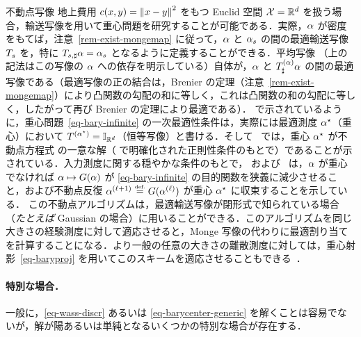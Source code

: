 \begin{rem2}{不動点写像}
地上費用 $c(x,y)=\left\| x-y \right\|^2$ をもつ Euclid 空間 $\mathcal{X}=\mathbb{R}^d$ を扱う場合，輸送写像を用いて重心問題を研究することが可能である．実際，$\alpha$ が密度をもてば，注意~\ref{rem-exist-mongemap} に従って，$\alpha$ と $\alpha_s$ の間の最適輸送写像 $T_s$ を，特に $T_{s,\sharp}\alpha = \alpha_s$ となるように定義することができる．平均写像
（上の記法はこの写像の $\alpha$ への依存を明示している）自体が，$\alpha$ と $T^{(\alpha)}_\sharp \alpha$ の間の最適写像である（最適写像の正の結合は，Brenier の定理（注意~\ref{rem-exist-mongemap}）により凸関数の勾配の和に等しく，これは凸関数の和の勾配に等しく，したがって再び Brenier の定理により最適である）．
\citep{Carlier_wasserstein_barycenter} で示されているように，重心問題~\eqref{eq-bary-infinite} の一次最適性条件は，実際には最適測度 $\alpha^\star$（重心）において $T^{(\alpha^\star)}=\mathbb{I}_{\mathbb{R}^d}$（恒等写像）と書ける．そして~\citep{alvarez2016fixed} では，重心 $\alpha^\star$ が不動点方程式
の一意な解（\citep[Theo. 2]{zemel2017fr} で明確化された正則性条件のもとで）であることが示されている．入力測度に関する穏やかな条件のもとで，\citet{alvarez2016fixed} および~\citet{zemel2017fr} は，$\alpha$ が重心でなければ $\alpha \mapsto G(\alpha)$ が \eqref{eq-bary-infinite} の目的関数を狭義に減少させること，および不動点反復 $\alpha^{(\ell+1)} \stackrel{\mbox{\upshape\tiny def.}}{=} G( \alpha^{(\ell)} )$ が重心 $\alpha^\star$ に収束することを示している．
%
この不動点アルゴリズムは，最適輸送写像が閉形式で知られている場合（\emph{たとえば} Gaussian の場合）に用いることができる．このアルゴリズムを同じ大きさの経験測度に対して適応させると，Monge 写像の代わりに最適割り当てを計算することになる．より一般の任意の大きさの離散測度に対しては，重心射影~\eqref{eq-baryproj} を用いてこのスキームを適応させることもできる~\citep{CuturiBarycenter}．
\end{rem2}



\paragraph{特別な場合．}

一般に，\eqref{eq-wass-discr} あるいは \eqref{eq-barycenter-generic} を解くことは容易でないが，解が陽あるいは単純となるいくつかの特別な場合が存在する．



